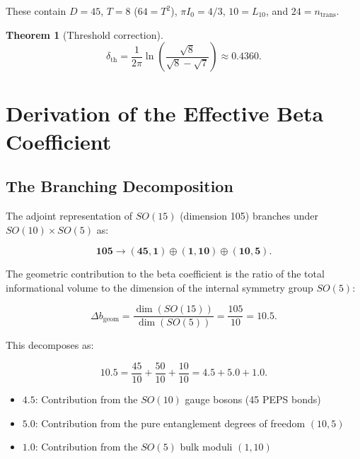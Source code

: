 \documentclass[12pt]{article}
\newtheorem{theorem}{Theorem}[section]
\begin{document}
These contain \(D=45\), \(T=8\) (\(64 = T^2\)), \(\pi I_0 = 4/3\), \(10 = L_{10}\), and \(24 = n_{\text{trans}}\).

\begin{theorem}[Threshold correction]
\begin{equation}
\boxed{\delta_{\text{th}} = \frac{1}{2\pi} \ln\left( \frac{\sqrt{8}}{\sqrt{8} - \sqrt{7}} \right) \approx 0.4360 .}
\label{eq:threshold}
\end{equation}
\end{theorem}

\section{Derivation of the Effective Beta Coefficient}

\subsection{The Branching Decomposition}

The adjoint representation of \(SO(15)\) (dimension 105) branches under \(SO(10) \times SO(5)\) as:

\begin{equation}
\mathbf{105} \to (\mathbf{45}, \mathbf{1}) \oplus (\mathbf{1}, \mathbf{10}) \oplus (\mathbf{10}, \mathbf{5}) .
\label{eq:branching}
\end{equation}

The geometric contribution to the beta coefficient is the ratio of the total informational volume to the dimension of the internal symmetry group \(SO(5)\):

\begin{equation}
\Delta b_{\text{geom}} = \frac{\dim(SO(15))}{\dim(SO(5))} = \frac{105}{10} = 10.5 .
\label{eq:deltab_geom}
\end{equation}

This decomposes as:

\[
10.5 = \frac{45}{10} + \frac{50}{10} + \frac{10}{10} = 4.5 + 5.0 + 1.0 .
\]

\begin{itemize}
  \item \(4.5\): Contribution from the \(SO(10)\) gauge bosons (45 PEPS bonds)
  \item \(5.0\): Contribution from the pure entanglement degrees of freedom \((10,5)\)
  \item \(1.0\): Contribution from the \(SO(5)\) bulk moduli \((1,10)\)
\end{itemize}
\end{document}

